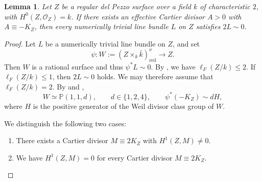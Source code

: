 \documentclass[10pt,abstract=true]{scrartcl}
\numberwithin{equation}{section}
\newtheorem{lemma}[theorem]{Lemma}
\theoremstyle{definition}
\theoremstyle{remark}
\begin{document}
\begin{lemma}\label{lemm:del-Pezzo-p2}
  Let $Z$ be a regular del Pezzo surface over a field $k$ of characteristic $2$, with $H^0(Z,\mathcal O_Z)=k$.
  If there exists an effective Cartier divisor $A>0$ with $A\equiv-K_Z$, then every numerically trivial line bundle $L$ on $Z$ satisfies $2L \sim 0$.
\end{lemma}
\begin{proof}
  Let $L$ be a numerically trivial line bundle on $Z$, and set
  \[
    \psi\colon W:=(Z\times_k\bar k)_{\mathrm{red}}^\nu\longrightarrow Z.
  \]
  Then $W$ is a rational surface and thus $\psi^*L\sim 0$.
  By \cite[Theorems~3.7]{Bernasconi-Tanaka-22}, we have $\ell_F(Z/k)\leq2$.
  If $\ell_F(Z/k)\leq1$, then $2 L \sim 0$ holds.
  We may therefore assume that $\ell_F(Z/k)=2$.
  By \cite[Theorem~3.5\textup{(4)}]{Bernasconi-Martin-2024-Bounding} and \cite[Theorem~4.6\textup{(3)}]{Tanaka-2024-Boundedness},
  \[
    W\simeq\mathbb P(1,1,d),\qquad d\in\{1,2,4\},\qquad
    \psi^*(-K_Z)\sim dH,
  \]
  where $H$ is the positive generator of the Weil divisor class group of $W$.

  We distinguish the following two cases:
  \begin{enumerate}[label=\textup{(\alph*)}]
    \item There exists a Cartier divisor $M\equiv2K_Z$ with $H^1(Z,M)\ne0$.
    \item We have $H^1(Z,M)=0$ for every Cartier divisor $M\equiv2K_Z$.
  \end{enumerate}


\end{proof}
\end{document}
